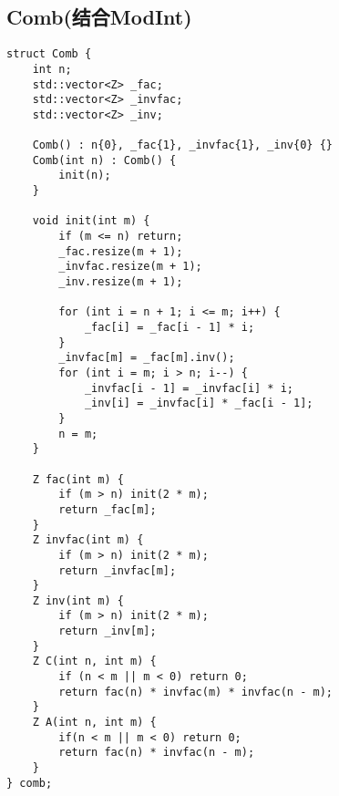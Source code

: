 \subsection{Comb(结合ModInt)}
\begin{lstlisting}
struct Comb {
    int n;
    std::vector<Z> _fac;
    std::vector<Z> _invfac;
    std::vector<Z> _inv;
    
    Comb() : n{0}, _fac{1}, _invfac{1}, _inv{0} {}
    Comb(int n) : Comb() {
        init(n);
    }
    
    void init(int m) {
        if (m <= n) return;
        _fac.resize(m + 1);
        _invfac.resize(m + 1);
        _inv.resize(m + 1);
        
        for (int i = n + 1; i <= m; i++) {
            _fac[i] = _fac[i - 1] * i;
        }
        _invfac[m] = _fac[m].inv();
        for (int i = m; i > n; i--) {
            _invfac[i - 1] = _invfac[i] * i;
            _inv[i] = _invfac[i] * _fac[i - 1];
        }
        n = m;
    }
    
    Z fac(int m) {
        if (m > n) init(2 * m);
        return _fac[m];
    }
    Z invfac(int m) {
        if (m > n) init(2 * m);
        return _invfac[m];
    }
    Z inv(int m) {
        if (m > n) init(2 * m);
        return _inv[m];
    }
    Z C(int n, int m) {
        if (n < m || m < 0) return 0;
        return fac(n) * invfac(m) * invfac(n - m);
    }
    Z A(int n, int m) {
        if(n < m || m < 0) return 0;
        return fac(n) * invfac(n - m);
    }
} comb;
\end{lstlisting}


